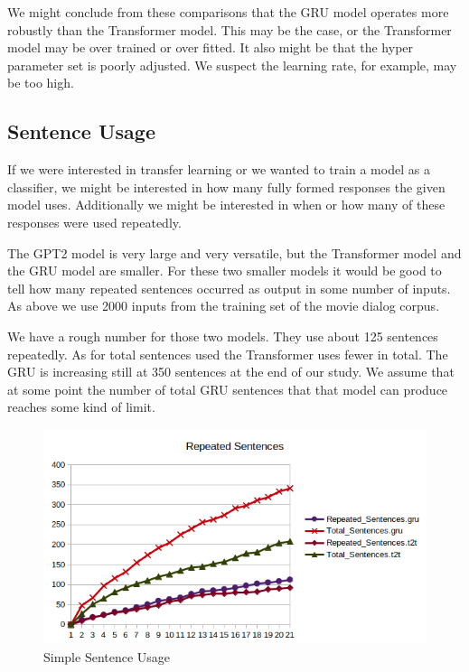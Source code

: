 We might conclude from these comparisons that the GRU model operates more robustly than the Transformer model. This may be the case, or the Transformer model may be over trained or over fitted. It also might be that the hyper parameter set is poorly adjusted. We suspect the learning rate, for example, may be too high.

\subsection{Sentence Usage}

If we were interested in transfer learning or we wanted to train a model as a classifier, we might be interested in how many fully formed responses the given model uses. Additionally we might be interested in when or how many of these responses were used repeatedly.

The GPT2 model is very large and very versatile, but the Transformer model and the GRU model are smaller. For these two smaller models it would be good to tell how many repeated sentences occurred as output in some number of inputs. As above we use 2000 inputs from the training set of the movie dialog corpus.

We have a rough number for those two models. They use about 125 sentences repeatedly. As for total sentences used the Transformer uses fewer in total. The GRU is increasing still at 350 sentences at the end of our study. We assume that at some point the number of total GRU sentences that that model can produce reaches some kind of limit.

\begin{figure}[H]
	\begin{center}
		\includegraphics[scale=0.75]{Figure_8}
		
		
	\end{center}
	\caption[Simple Sentence Usage]{Simple Sentence Usage}
	
	
\end{figure}


